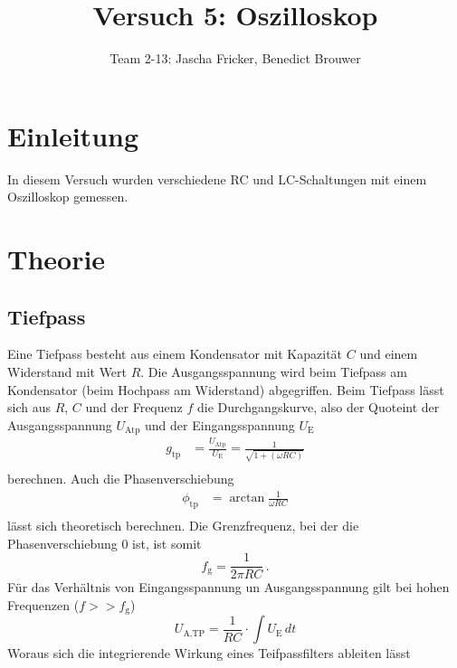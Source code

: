 \documentclass[11pt, a4paper]{article}
\title{Versuch 5: Oszilloskop}
\author{Team 2-13: Jascha Fricker, Benedict Brouwer}
\begin{document}
    \maketitle

    \tableofcontents

    \newpage

    \section{Einleitung}
    In diesem Versuch wurden verschiedene RC und LC-Schaltungen mit einem Oszilloskop gemessen.

    \section{Theorie}

    \subsection{Tiefpass}
    Eine Tiefpass besteht aus einem Kondensator mit Kapazität $C$ und einem Widerstand mit Wert $R$. Die Ausgangsspannung wird beim Tiefpass am Kondensator (beim Hochpass am Widerstand) abgegriffen.
    Beim Tiefpass lässt sich aus $R$, $C$ und der Frequenz $f$ die Durchgangskurve, also der Quoteint der Ausgangsspannung $U_{\text{Atp}}$ und der Eingangsspannung $U_{\text{E}}$ 
    \begin{align}
        g_{\text{tp}} &= \frac{U_{\text{Atp}}}{U_{\text{E}}} = \frac{1}{\sqrt{1 + \left( \omega R C \right)}} \\ \label{eq:TiefDurch}
    \end{align}
    berechnen. Auch die Phasenverschiebung
    \begin{align}
        \phi_{\text{tp}} &= \arctan{\frac{1}{\omega R C}} \\ \label{eq:TiefPha}
    \end{align}
    lässt sich theoretisch berechnen.
    Die Grenzfrequenz, bei der die Phasenverschiebung 0 ist, ist somit
    \begin{equation}
        f_{\text{g}} = \frac{1}{2 \pi R C} \,. \label{eq:Grenzfrequenz}
    \end{equation}
    Für das Verhältnis von Eingangsspannung un Ausgangsspannung gilt bei hohen Frequenzen ($f >> f_{\text{g}}$)
    \begin{equation}
        U_{\text{A,TP}}= \frac{1}{RC} \cdot \int U_{\text{E}} \,dt \label{eq:tpint}
    \end{equation}
    Woraus sich die integrierende Wirkung eines Teifpassfilters ableiten lässt
\end{document}
